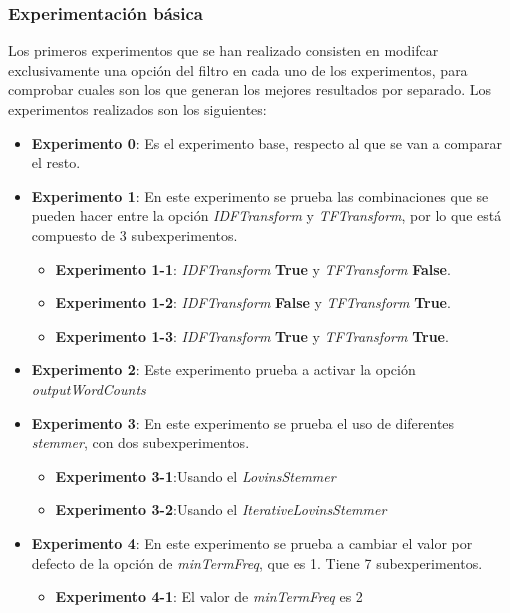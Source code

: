 \documentclass[12pt,a4paper, xcolor=table]{article}
\begin{document}
      \subsubsection{Experimentación básica}
        Los primeros experimentos que se han realizado consisten en modifcar exclusivamente una opción del filtro en cada uno de los experimentos, para comprobar cuales son los que generan los mejores resultados por separado. Los experimentos realizados son los siguientes:

        \begin{itemize}
          \item \textbf{Experimento 0}: Es el experimento base, respecto al que se van a comparar el resto.
          \item \textbf{Experimento 1}: En este experimento se prueba las combinaciones que se pueden hacer entre la opción \textit{IDFTransform} y \textit{TFTransform}, por lo que está compuesto de 3 subexperimentos.
          \begin{itemize}
            \item \textbf{Experimento 1-1}: \textit{IDFTransform} \textbf{True} y \textit{TFTransform} \textbf{False}.
            \item \textbf{Experimento 1-2}: \textit{IDFTransform} \textbf{False} y \textit{TFTransform} \textbf{True}.
            \item \textbf{Experimento 1-3}: \textit{IDFTransform} \textbf{True} y \textit{TFTransform} \textbf{True}.
          \end{itemize}
          \item \textbf{Experimento 2}: Este experimento prueba a activar la opción \textit{outputWordCounts}
          \item \textbf{Experimento 3}: En este experimento se prueba el uso de diferentes \textit{stemmer}, con dos subexperimentos.
          \begin{itemize}
            \item \textbf{Experimento 3-1}:Usando el \textit{LovinsStemmer}
            \item \textbf{Experimento 3-2}:Usando el \textit{IterativeLovinsStemmer}
          \end{itemize}
          \item \textbf{Experimento 4}: En este experimento se prueba a cambiar el valor por defecto de la opción de \textit{minTermFreq}, que es 1. Tiene 7 subexperimentos.
          \begin{itemize}
            \item \textbf{Experimento 4-1}: El valor de \textit{minTermFreq} es 2

\end{itemize}
\end{itemize}
\end{document}

